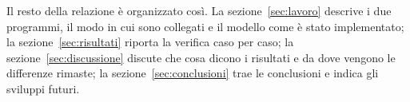 Il resto della relazione è organizzato così. La
sezione~\ref{sec:lavoro} descrive i due programmi, il modo in cui sono
collegati e il modello come è stato implementato; la
sezione~\ref{sec:risultati} riporta la verifica caso per caso; la
sezione~\ref{sec:discussione} discute che cosa dicono i risultati e da dove
vengono le differenze rimaste; la sezione~\ref{sec:conclusioni} trae le
conclusioni e indica gli sviluppi futuri.
